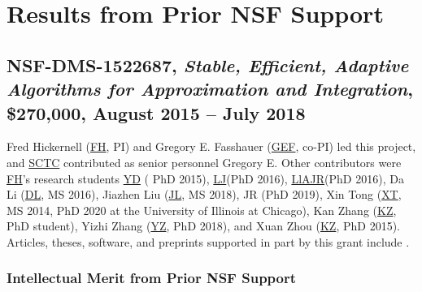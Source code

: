 \documentclass[11pt]{NSFamsart}
\newcommand{\FH}{\hyperlink{FHlink}{FH}\xspace}
\newcommand{\SCTC}{\hyperlink{SCTClink}{SCTC}\xspace}
\newcommand{\GEF}{\hyperlink{GEFlink}{GEF}\xspace}
\newcommand{\YD}{\hyperlink{YDlink}{YD}\xspace}
\newcommand{\LlAJR}{\hyperlink{LlAJRlink}{LlAJR}\xspace}
\newcommand{\LJ}{\hyperlink{LJlink}{LJ}\xspace}
\newcommand{\XT}{\hyperlink{XTlink}{XT}\xspace}
\newcommand{\KZ}{\hyperlink{KZlink}{KZ}\xspace}
\newcommand{\DL}{\hyperlink{DLlink}{DL}\xspace}
\newcommand{\XZ}{\hyperlink{XZlink}{KZ}\xspace}
\newcommand{\JL}{\hyperlink{JLlink}{JL}\xspace}
\newcommand{\YZ}{\hyperlink{YZlink}{YZ}\xspace}
\begin{document}
\section{Results from Prior NSF Support} \label{sec:prior_work}

\subsection{NSF-DMS-1522687, \emph{Stable, Efficient, Adaptive Algorithms for
		Approximation and Integration},
	\$270,000, August 2015 -- July 2018} \label{sec:PreviousFred}
Fred Hickernell (\FH, PI) and Gregory E. Fasshauer (\GEF, co-PI) led this project, and \SCTC contributed as senior personnel
Gregory E.  Other contributors were \FH's research students {\YD} ( PhD 2015), \LJ (PhD 2016),
\LlAJR (PhD 2016), \hypertarget{DLlink}{Da Li} (\DL, MS 2016), \hypertarget{JLlink}{Jiazhen Liu} (\JL, MS 2018), JR (PhD 2019), \hypertarget{XTlink}{Xin Tong} (\XT, MS 2014, PhD 2020 at the University of Illinois at Chicago), \hypertarget{KZlink}{Kan Zhang} (\KZ, PhD student), \hypertarget{YZlink}{Yizhi Zhang} (\YZ, PhD 2018), and \hypertarget{XZlink}{Xuan Zhou} (\XZ, PhD 2015).  Articles, theses,
software, and preprints supported in
part by this
grant
include
\cite{ala_augmented_2017,
	ChoEtal17a,
	ChoEtal21a,
	Din15a,
	DinHic20a,
	GilEtal16a,
	Hic17a,
	HicJag18b,
	HicJim16a,
	HicEtal18a,
	HicEtal17a,
	HicKriWoz19a,
	RatHic19a,
	GilJim16b,
	JimHic16a,
	JohFasHic18a,
	Li16a,
	Liu17a,
	MarEtal18a,
	mccourt_stable_2017,
	MCCEtal19a,
	mishra_hybrid_2018,
	MisEtal19a,
	rashidinia_stable_2016,
	rashidinia_stable_2018,
	Zha18a,
	Zha17a,
	Zho15a,
	ZhoHic15a}.

\subsubsection{Intellectual Merit from Prior NSF Support}
\label{previousmeritsubsec}
\end{document}
